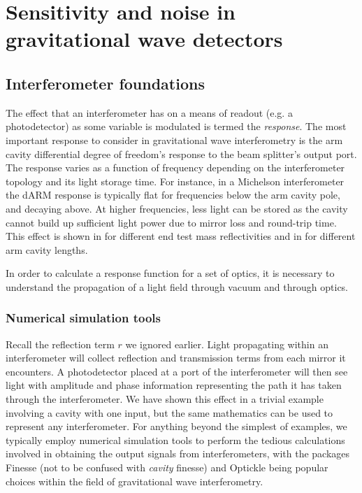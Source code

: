 \chapter{Sensitivity and noise in gravitational wave detectors}
\label{c:instrumentation}


\section{Interferometer foundations}

The effect that an interferometer has on a means of readout (e.g. a photodetector) as some variable is modulated is termed the \emph{response}. The most important response to consider in gravitational wave interferometry is the arm cavity differential degree of freedom's response to the beam splitter's output port. The response varies as a function of frequency depending on the interferometer topology and its light storage time. For instance, in a Michelson interferometer the dARM response is typically flat for frequencies below the arm cavity pole, and decaying  above. At higher frequencies, less light can be stored as the cavity cannot build up sufficient light power due to mirror loss and round-trip time. This effect is shown in  for different end test mass reflectivities and in  for different arm cavity lengths.

In order to calculate a response function for a set of optics, it is necessary to understand the propagation of a light field through vacuum and through optics.


\subsection{Numerical simulation tools}
Recall the reflection term $r$ we ignored earlier. Light propagating within an interferometer will collect reflection and transmission terms from each mirror it encounters. A photodetector placed at a port of the interferometer will then see light with amplitude and phase information representing the path it has taken through the interferometer. We have shown this effect in a trivial example involving a \FP{} cavity with one input, but the same mathematics can be used to represent any interferometer. For anything beyond the simplest of examples, we typically employ numerical simulation tools to perform the tedious calculations involved in obtaining the output signals from interferometers, with the packages Finesse \cite{Freise2004} (not to be confused with \emph{cavity} finesse) and Optickle \cite{Evans2012} being popular choices within the field of gravitational wave interferometry.

